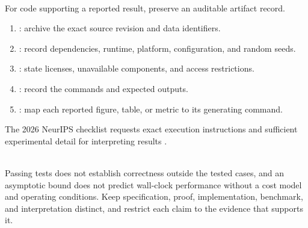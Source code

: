\begin{process} \label{proc:computational-artifact-record} \\
For code supporting a reported result, preserve an auditable artifact record.
\begin{enumerate}[label=(\roman*)]
\setlength{\itemsep}{0pt}
\item {}: archive the exact source revision and data identifiers.
\item {}: record dependencies, runtime, platform, configuration, and random seeds.
\item {}: state licenses, unavailable components, and access restrictions.
\item {}: record the commands and expected outputs.
\item {}: map each reported figure, table, or metric to its generating command.
\end{enumerate}
The 2026 NeurIPS checklist requests exact execution instructions and sufficient experimental detail for interpreting results \citep{neurips2026checklist}.
\end{process}

\begin{warning} \label{warn:algorithm-evidence-boundaries} \\
Passing tests does not establish correctness outside the tested cases, and an asymptotic bound does not predict wall-clock performance without a cost model and operating conditions. Keep specification, proof, implementation, benchmark, and interpretation distinct, and restrict each claim to the evidence that supports it.
\end{warning}
